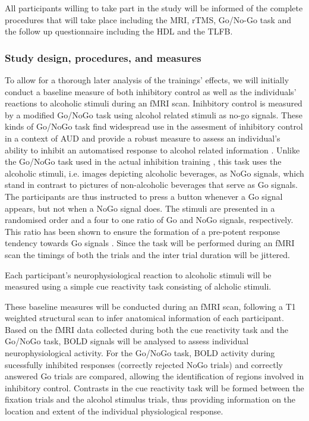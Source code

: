 \documentclass[12pt]{article}
\begin{document}
All participants willing to take part in the study will be informed of the complete procedures that will take place including the MRI, rTMS, Go/No-Go task and the follow up questionnaire including the HDL and the TLFB.

\subsubsection{Study design, procedures, and measures}

To allow for a thorough later analysis of the trainings' effects, we will initially conduct a baseline measure of both inhibitory control as well as the individuals' reactions to alcoholic stimuli during an fMRI scan. Inihbitory control is measured by a modified Go/NoGo task using alcohol related stimuli as no-go signals. These kinds of Go/NoGo task find widespread use in the assesment of inhibitory control in a context of AUD and provide a robust measure to assess an individual's ability to inhibit an automatised response to alcohol related information \parencite{amesNeuralCorrelatesGo2014,bowleyEffectsInhibitoryControl2013,roseEffectsAlcoholInhibitory2008,simmondsMetaanalysisGoNogo2008}. Unlike the Go/NoGo task used in the actual inhibition training \parencite{houbenBeerNogoLearning2012}, this task uses the alcoholic stimuli, i.e. images depicting alcoholic beverages, as NoGo signals, which stand in contrast to pictures of non-alcoholic beverages that serve as Go signals. The participants are thus instructed to press a button whenever a Go signal appears, but not when a NoGo signal does. The stimuli are presented in a randomised order and a four to one ratio of Go and NoGo signals, respectively. This ratio has been shown to ensure the formation of a pre-potent response tendency towards Go signals \parencite{amesNeuralCorrelatesGo2014}. Since the task will be performed during an fMRI scan the timings of both the trials and the inter trial duration will be jittered.

Each participant's neurophysiological reaction to alcoholic stimuli will be measured using a simple cue reactivity task consisting of alcholic stimuli. 

These baseline measures will be conducted during an fMRI scan, following a T1 weighted structural scan to infer anatomical information of each participant. Based on the fMRI data collected during both the cue reactivity task and the Go/NoGo task, BOLD signals will be analysed to assess individual neurophysiological activity. For the Go/NoGo task, BOLD activity during sucessfully inhibited responses (correctly rejected NoGo trials) and correctly answered Go trials are compared, allowing the identification of regions involved in inhibitory control. Contrasts in the cue reactivity task will be formed between the fixation trials and the alcohol stimulus trials, thus providing information on the location and extent of the individual physiological response.
\end{document}
